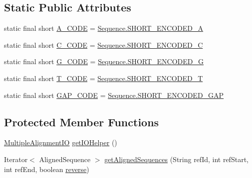 \subsection*{Static Public Attributes}
\begin{DoxyCompactItemize}
\item 
static final short \hyperlink{classbroad_1_1core_1_1multiplealignment_1_1_multiple_alignment_ab0fe06f719795021c54605f3e252d3fa}{A\+\_\+\+C\+O\+D\+E} = \hyperlink{classbroad_1_1core_1_1sequence_1_1_sequence_a5e9588156dd0a4c914cf8ea5e46dc288}{Sequence.\+S\+H\+O\+R\+T\+\_\+\+E\+N\+C\+O\+D\+E\+D\+\_\+\+A}
\item 
static final short \hyperlink{classbroad_1_1core_1_1multiplealignment_1_1_multiple_alignment_a2e2aba2b96a17a177bd95d466059031d}{C\+\_\+\+C\+O\+D\+E} = \hyperlink{classbroad_1_1core_1_1sequence_1_1_sequence_a7eaf6345f01e26bfcf1925adb7b63b6a}{Sequence.\+S\+H\+O\+R\+T\+\_\+\+E\+N\+C\+O\+D\+E\+D\+\_\+\+C}
\item 
static final short \hyperlink{classbroad_1_1core_1_1multiplealignment_1_1_multiple_alignment_a9dc0680bd4e9988d3fd95e3b29247246}{G\+\_\+\+C\+O\+D\+E} = \hyperlink{classbroad_1_1core_1_1sequence_1_1_sequence_a1035184882e0829351d913c8212b8e99}{Sequence.\+S\+H\+O\+R\+T\+\_\+\+E\+N\+C\+O\+D\+E\+D\+\_\+\+G}
\item 
static final short \hyperlink{classbroad_1_1core_1_1multiplealignment_1_1_multiple_alignment_a2611fa255a25484a3ccfb4fcbf7326f3}{T\+\_\+\+C\+O\+D\+E} = \hyperlink{classbroad_1_1core_1_1sequence_1_1_sequence_aa8830afd48b5456f422e0d4ac282c3e4}{Sequence.\+S\+H\+O\+R\+T\+\_\+\+E\+N\+C\+O\+D\+E\+D\+\_\+\+T}
\item 
static final short \hyperlink{classbroad_1_1core_1_1multiplealignment_1_1_multiple_alignment_ab6be2a517b748bbf3c4fb8da3be81920}{G\+A\+P\+\_\+\+C\+O\+D\+E} = \hyperlink{classbroad_1_1core_1_1sequence_1_1_sequence_af6b23c272152e3450a5ed58c95b31fdb}{Sequence.\+S\+H\+O\+R\+T\+\_\+\+E\+N\+C\+O\+D\+E\+D\+\_\+\+G\+A\+P}
\end{DoxyCompactItemize}
\subsection*{Protected Member Functions}
\begin{DoxyCompactItemize}
\item 
\hyperlink{interfacebroad_1_1core_1_1multiplealignment_1_1_multiple_alignment_i_o}{Multiple\+Alignment\+I\+O} \hyperlink{classbroad_1_1core_1_1multiplealignment_1_1_multiple_alignment_a9c520e0b975a9041f83a44e1900a4b19}{get\+I\+O\+Helper} ()
\item 
Iterator$<$ Aligned\+Sequence $>$ \hyperlink{classbroad_1_1core_1_1multiplealignment_1_1_multiple_alignment_a3ea610d857c20a1a1e3de8168a42da41}{get\+Aligned\+Sequences} (String ref\+Id, int ref\+Start, int ref\+End, boolean \hyperlink{classbroad_1_1core_1_1multiplealignment_1_1_multiple_alignment_a8f6e8453396f6094a44858f6b8f66c31}{reverse})
\end{DoxyCompactItemize}
